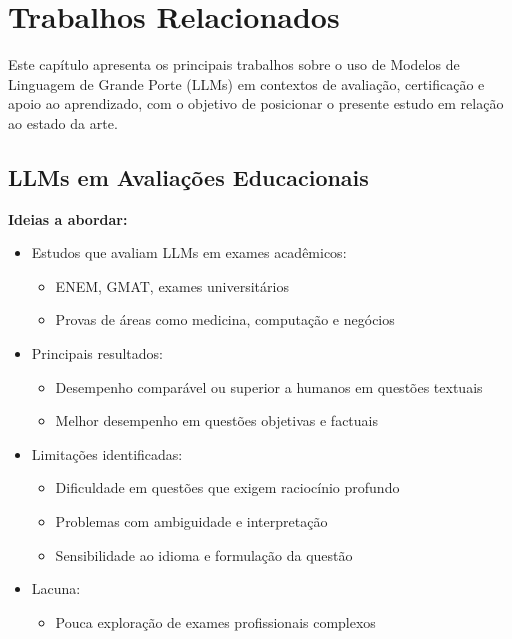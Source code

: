 \chapter{Trabalhos Relacionados}
\label{sec:relacionados}


Este capítulo apresenta os principais trabalhos sobre o uso de Modelos de Linguagem de Grande Porte (LLMs) em contextos de avaliação, certificação e apoio ao aprendizado, com o objetivo de posicionar o presente estudo em relação ao estado da arte.


\section{LLMs em Avaliações Educacionais}
\label{subsec:llm_educacao}

\textbf{Ideias a abordar:}
\begin{itemize}
    \item Estudos que avaliam LLMs em exames acadêmicos:
    \begin{itemize}
        \item ENEM, GMAT, exames universitários
        \item Provas de áreas como medicina, computação e negócios
    \end{itemize}
    \item Principais resultados:
    \begin{itemize}
        \item Desempenho comparável ou superior a humanos em questões textuais
        \item Melhor desempenho em questões objetivas e factuais
    \end{itemize}
    \item Limitações identificadas:
    \begin{itemize}
        \item Dificuldade em questões que exigem raciocínio profundo
        \item Problemas com ambiguidade e interpretação
        \item Sensibilidade ao idioma e formulação da questão
    \end{itemize}
    \item Lacuna:
    \begin{itemize}
        \item Pouca exploração de exames profissionais complexos
    \end{itemize}
\end{itemize}



